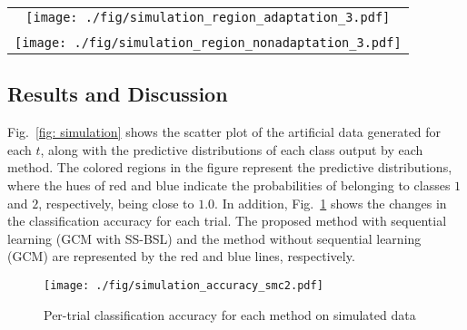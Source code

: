 \documentclass[letterpaper, 10 pt, conference]{ieeeconf}
\begin{document}
\begin{figure*}[t]
  \begin{tabular}{c}
    \begin{minipage}[t]{\hsize}
      \centering
      \texttt{[image: ./fig/simulation\_region\_adaptation\_3.pdf]}
      \centering{\subcaption{GCM with SS-BSL (\textbf{ours})}}
      \label{simulation_proposed}
    \end{minipage}\\\\
    \begin{minipage}[t]{\hsize}
      \centering
      \texttt{[image: ./fig/simulation\_region\_nonadaptation\_3.pdf]}
      \centering{\subcaption{GCM}}
      \label{simulation_nonadaptation}
    \end{minipage}
  \end{tabular}
  \caption{Snapshots of the sequential learning process for each method. The red and blue areas indicate predictive
  distribution of class labels close to $1.0$ for classes $1$ and $2$, respectively.}
  \label{fig: simulation}
\end{figure*}

\subsection{Results and Discussion}
Fig.~\ref{fig: simulation} shows the scatter plot of the artificial data generated for each $t$, along with the predictive distributions of each class output by each method. 
The colored regions in the figure represent the predictive distributions, where the hues of red and blue indicate the probabilities of belonging to classes $1$ and $2$, respectively, being close to $1.0$. 
In addition, Fig.~\ref{fig :simulation_accuracy} shows the changes in the classification accuracy for each trial. 
The proposed method with sequential learning (GCM with SS-BSL) and the method without sequential learning (GCM) are represented by the red and blue lines, respectively.


\begin{figure}[t]
    \centering
    \texttt{[image: ./fig/simulation\_accuracy\_smc2.pdf]}
      \caption{Per-trial classification accuracy for each method on simulated data}  
     \label{fig :simulation_accuracy}
\end{figure}
\end{document}

